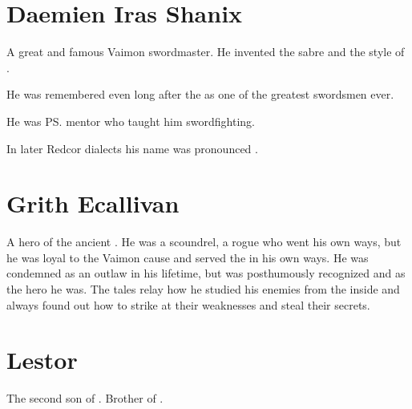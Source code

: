 \section{Daemien Iras Shanix}
A great and famous Vaimon swordmaster. 
He invented the  sabre and the style of . 

He was remembered even long after the \Darkfall{} as one of the greatest swordsmen ever. 

He was \ps{\VizicarDurasRespina} mentor who taught him swordfighting. 

In later Redcor dialects his name was pronounced \DamianChanici. 















\section{Grith Ecallivan}
A hero of the ancient . 
He was a scoundrel, a rogue who went his own ways, but he was loyal to the Vaimon cause and served the \caliphate in his own ways. 
He was condemned as an outlaw in his lifetime, but was posthumously recognized and \honoured as the hero he was. 
The tales relay how he studied his enemies from the inside and always found out how to strike at their weaknesses and steal their secrets. 















\section{Lestor \Delaen}
The second son of . 
Brother of . 









